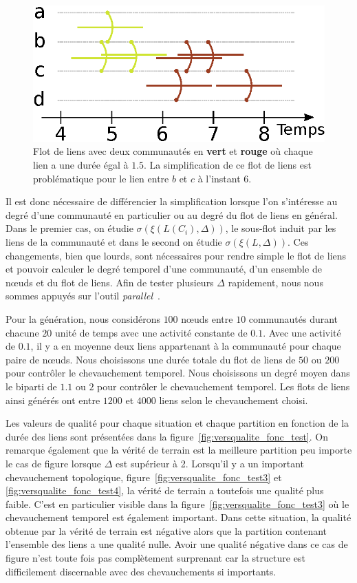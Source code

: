\begin{figure}
\centering
	\includegraphics[width=0.65\linewidth]{img/Qualite/inter_flot.eps}
\caption{Flot de liens avec deux communautés en \textcolor{olivegreen}{\textbf{vert}} et  \textcolor{briquered}{\textbf{rouge}} où chaque lien a une durée égal à $1.5$.
La simplification de ce flot de liens est problématique pour le lien entre $b$ et $c$ à l'instant $6$.}
\label{fig:qualite_simplification}
\end{figure}

Il est donc nécessaire de différencier la simplification lorsque l'on s'intéresse au degré d'une communauté en particulier ou au degré du flot de liens en général.
Dans le premier cas, on étudie $\sigma(\xi(L(C_i),\Delta))$, le sous-flot induit par les liens de la communauté et dans le second on étudie $\sigma(\xi(L,\Delta))$.
Ces changements, bien que lourds, sont nécessaires pour rendre simple le flot de liens et pouvoir calculer le degré temporel d'une communauté, d'un ensemble de n\oe{}uds et du flot de liens.
Afin de tester plusieurs $\Delta$ rapidement, nous nous sommes appuyés sur l'outil \emph{parallel}~\cite{Tange2011a}.


\bigskip
Pour la génération, nous considérons $100$ n\oe{}uds entre $10$ communautés durant chacune $20$ unité de temps avec une activité constante de $0.1$.
Avec une activité de $0.1$, il y a en moyenne deux liens appartenant à la communauté pour chaque paire de n\oe{}uds.
Nous choisissons une durée totale du flot de liens de $50$ ou $200$ pour contrôler le chevauchement temporel.
Nous choisissons un degré moyen dans le biparti de $1.1$ ou $2$ pour contrôler le chevauchement temporel.
Les flots de liens ainsi générés ont entre $1 200$ et $4 000$ liens selon le chevauchement choisi.

Les valeurs de qualité pour chaque situation et chaque partition en fonction de la durée des liens sont présentées dans la figure~\ref{fig:versqualite_fonc_test}.
On remarque également que la vérité de terrain est la meilleure partition peu importe le cas de figure lorsque $\Delta$ est supérieur à 2.
Lorsqu'il y a un important chevauchement topologique, figure~\ref{fig:versqualite_fonc_test3} et \ref{fig:versqualite_fonc_test4}, la vérité de terrain a toutefois une qualité plus faible.
C'est en particulier visible dans la figure~\ref{fig:versqualite_fonc_test3} où le chevauchement temporel est également important.
Dans cette situation, la qualité obtenue par la vérité de terrain est négative alors que la partition contenant l'ensemble des liens a une qualité nulle.
Avoir une qualité négative dans ce cas de figure n'est toute fois pas complètement surprenant car la structure est difficilement discernable avec des chevauchements si importants.


